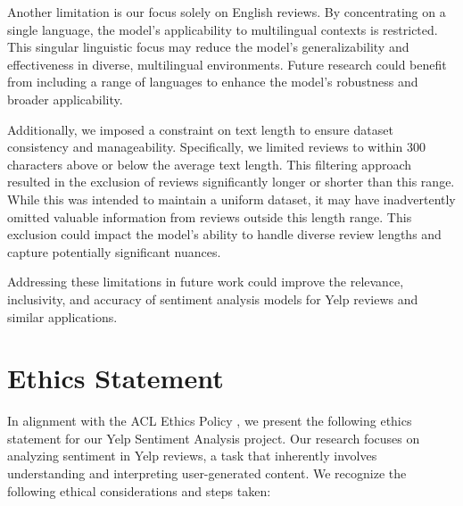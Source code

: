 \documentclass[12pt]{article}
\begin{document}
Another limitation is our focus solely on English reviews. By concentrating on a single language, the model’s applicability to multilingual contexts is restricted. This singular linguistic focus may reduce the model's generalizability and effectiveness in diverse, multilingual environments. Future research could benefit from including a range of languages to enhance the model's robustness and broader applicability.

Additionally, we imposed a constraint on text length to ensure dataset consistency and manageability. Specifically, we limited reviews to within 300 characters above or below the average text length. This filtering approach resulted in the exclusion of reviews significantly longer or shorter than this range. While this was intended to maintain a uniform dataset, it may have inadvertently omitted valuable information from reviews outside this length range. This exclusion could impact the model’s ability to handle diverse review lengths and capture potentially significant nuances.

Addressing these limitations in future work could improve the relevance, inclusivity, and accuracy of sentiment analysis models for Yelp reviews and similar applications.

\section*{Ethics Statement}

In alignment with the ACL Ethics Policy \citep{acl2023ethics}, we present the following ethics statement for our Yelp Sentiment Analysis project. Our research focuses on analyzing sentiment in Yelp reviews, a task that inherently involves understanding and interpreting user-generated content. We recognize the following ethical considerations and steps taken:
\end{document}
